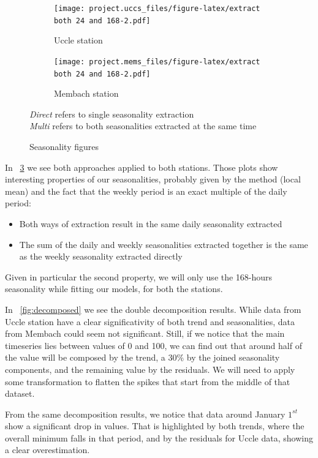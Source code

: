 \documentclass[12pt]{article}
\begin{document}
\begin{figure}[h]
	\begin{subfigure}{.5\linewidth}
		\texttt{[image: project.uccs\_files/figure-latex/extract both 24 and 168-2.pdf]}
		\caption{Uccle station}
		\label{fig:direct-multi-seasonality:uccs}
	\end{subfigure}
	\begin{subfigure}{.5\linewidth}
		\texttt{[image: project.mems\_files/figure-latex/extract both 24 and 168-2.pdf]}
		\caption{Membach station}
		\label{fig:direct-multi-seasonality:mems}
	\end{subfigure}
	\caption{Seasonality figures}{\centering\small\textit{Direct} refers to single seasonality extraction\\\centering\textit{Multi} refers to both seasonalities extracted at the same time\\}
	\label{fig:direct-multi-seasonality}
\end{figure}
%
In \figurename~\ref{fig:direct-multi-seasonality} we see both approaches applied to both stations. Those plots show interesting properties of our seasonalities, probably given by the method (local mean) and the fact that the weekly period is an exact multiple of the daily period:
\begin{itemize}[topsep=0.5em,itemsep=0em,partopsep=0.5em]
	\item Both ways of extraction result in the same daily seasonality extracted
	\item The sum of the daily and weekly seasonalities extracted together is the same as the weekly seasonality extracted directly
\end{itemize}
Given in particular the second property, we will only use the 168-hours seasonality while fitting our models, for both the stations.

In \figurename~\ref{fig:decomposed} we see the double decomposition results. While data from Uccle station have a clear significativity of both trend and seasonalities, data from Membach could seem not significant. Still, if we notice that the main timeseries lies between values of 0 and 100, we can find out that around half of the value will be composed by the trend, a 30\% by the joined seasonality components, and the remaining value by the residuals. We will need to apply some transformation to flatten the spikes that start from the middle of that dataset.

From the same decomposition results, we notice that data around January $1^{st}$ show a significant drop in values. That is highlighted by both trends, where the overall minimum falls in that period, and by the residuals for Uccle data, showing a clear overestimation.
\end{document}
